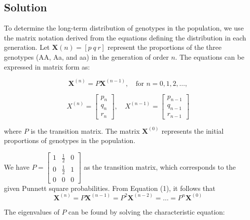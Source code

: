 \documentclass[a4paper,12pt]{article}
\begin{document}
\subsection{Solution}
To determine the long-term distribution of genotypes in the population, we use the matrix notation derived from the equations defining the distribution in each generation. Let $\mathbf{X}(n) = [p\ q\ r]$ represent the proportions of the three genotypes (AA, Aa, and aa) in the generation of order $n$. The equations can be expressed in matrix form as:

\[
\mathbf{X}^{(n)} = P\mathbf{X}^{(n-1)}, \quad \text{for } n = 0, 1, 2, \ldots, \tag{1}
\]

\[
X^{(n)} = \begin{bmatrix} p_{n} \\ q_{n} \\ r_{n}\end{bmatrix}, \quad X^{(n-1)} = \begin{bmatrix} p_{n-1} \\ q_{n-1} \\ r_{n-1} \end{bmatrix}
\]


where $P$ is the transition matrix. The matrix $\mathbf{X}^{(0)}$ represents the initial proportions of genotypes in the population.

We have $P = \begin{bmatrix} 1 & \frac{1}{2} & 0 \\ 0 & \frac{1}{2} & 1 \\ 0 & 0 & 0 \end{bmatrix}$ as the transition matrix, which corresponds to the given Punnett square probabilities.
From Equation (1), it follows that
\[
\mathbf{X}^{(n)} = P\mathbf{X}^{(n-1)} =P^{2}\mathbf{X}^{(n-2)}=\ldots=P^{n}\mathbf{X}^{(0)} \tag{2}
\]

The eigenvalues of $P$ can be found by solving the characteristic equation:
\end{document}

